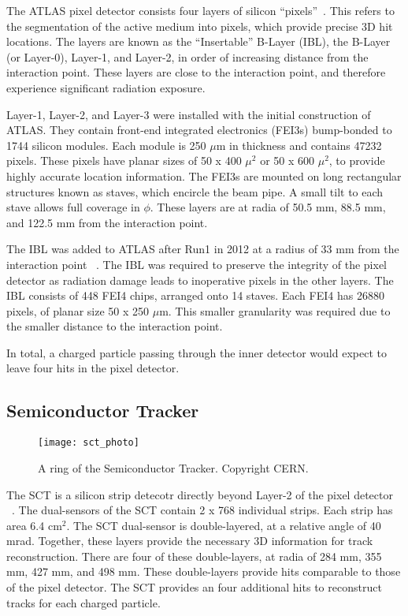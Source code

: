 The ATLAS pixel detector consists four layers of silicon ``pixels''~\cite{Aad:2008zz}.
This refers to the segmentation of the active medium into pixels, which provide precise 3D hit locations.
The layers are known as the ``Insertable'' B-Layer (IBL), the B-Layer (or Layer-0), Layer-1, and Layer-2, in order of increasing distance from the interaction point.
These layers are close to the interaction point, and therefore experience significant radiation exposure.

Layer-1, Layer-2, and Layer-3 were installed with the initial construction of ATLAS.
They contain front-end integrated electronics (FEI3s) bump-bonded to 1744 silicon modules.
Each module is 250 $\mu$m in thickness and contains 47232 pixels.
These pixels have planar sizes of 50 x 400 $\mu^2$ or  50 x 600 $\mu^2$, to provide highly accurate location information.
The FEI3s are mounted on long rectangular structures known as staves, which encircle the beam pipe.
A small tilt to each stave allows full coverage in $\phi$.
These layers are at radia of 50.5 mm, 88.5 mm, and 122.5 mm from the interaction point.

The IBL was added to ATLAS after Run1 in 2012 at a radius of 33 mm from the interaction point ~\cite{B-layerRef}.
The IBL was required to preserve the integrity of the pixel detector as radiation damage leads to inoperative pixels in the other layers.
The IBL consists of 448 FEI4 chips, arranged onto 14 staves.
Each FEI4 has 26880 pixels, of planar size 50 x 250 $\mu$m.
This smaller granularity was required due to the smaller distance to the interaction point.

In total, a charged particle passing through the inner detector would expect to leave four hits in the pixel detector.

\subsection{Semiconductor Tracker}
\begin{figure}[tbp]
\caption{A ring of the Semiconductor Tracker. Copyright CERN.} \label{fig:sct_photo}
\texttt{[image: sct\_photo]}
\end{figure}

The SCT is a silicon strip detecotr directly beyond Layer-2 of the pixel detector ~\cite{IDET-2013-01}.
The dual-sensors of the SCT contain 2 x 768 individual strips.
Each strip has area 6.4 cm$^2$.
The SCT dual-sensor is double-layered, at a relative angle of 40 mrad.
Together, these layers provide the necessary 3D information for track reconstruction.
There are four of these double-layers, at radia of 284 mm, 355 mm, 427 mm, and 498 mm.
These double-layers provide hits comparable to those of the pixel detector.
The SCT provides an four additional hits to reconstruct tracks for each charged particle.


